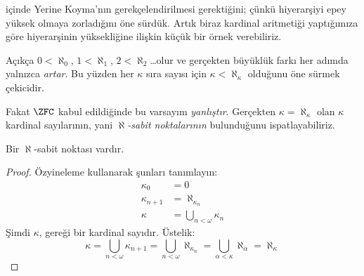 \documentclass[../../../include/open-logic-section]{subfiles}
\begin{document}

 içinde Yerine Koyma'nın gerekçelendirilmesi
gerektiğini; çünkü hiyerarşiyi epey yüksek olmaya zorladığını öne sürdük.
Artık biraz kardinal aritmetiği yaptığımıza göre hiyerarşinin yüksekliğine
ilişkin küçük bir örnek verebiliriz.

Açıkça $0<\aleph_0$, $1<\aleph_1$, $2<\aleph_2$\ldots olur ve gerçekten
büyüklük farkı her adımda yalnızca \emph{artar}. Bu yüzden her $\kappa$
sıra sayısı için $\kappa<\aleph_\kappa$ olduğunu öne sürmek çekicidir.

Fakat $\ZFC$ kabul edildiğinde bu varsayım \emph{yanlıştır}. Gerçekten
$\kappa=\aleph_\kappa$ olan $\kappa$ kardinal sayılarının, yani
\emph{$\aleph$-sabit noktalarının} bulunduğunu ispatlayabiliriz.

\begin{prop}
Bir $\aleph$-sabit noktası vardır.
\end{prop}

\begin{proof}
Özyineleme kullanarak şunları tanımlayın:
\begin{align*}
	\kappa_0 &= 0\\
	\kappa_{n+1} &= \aleph_{\kappa_n}\\
	\kappa&= \bigcup_{n < \omega}\kappa_n
\end{align*}
Şimdi $\kappa$, 
gereği bir kardinal sayıdır. Üstelik:
\[
	\kappa= \bigcup_{n < \omega} \kappa_{n+1} =
	\bigcup_{n < \omega}\aleph_{\kappa_n} =
	\bigcup_{\alpha < \kappa}\aleph_\alpha = \aleph_\kappa
\]
\end{proof}
\end{document}
